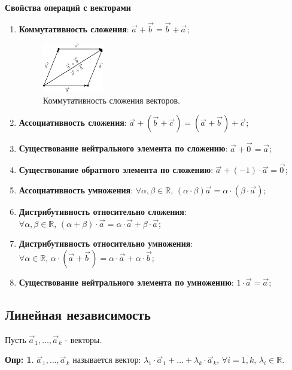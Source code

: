 \documentclass[12pt]{article}
\newcommand{\MR}{\mathbb{R}}
\theoremstyle{definition}
\newtheorem{defn}{Опр:}
\newcommand{\vecm}[1]{\overrightarrow{#1\,}}
\begin{document}
\textbf{Свойства операций с векторами}
\begin{enumerate}[label=\arabic*)]
	\item \textbf{Коммутативность сложения}: $\vecm{a} + \vecm{b} = \vecm{b} + \vecm{a}$;
	\begin{figure}[H]
		\centering
		\includegraphics[width=0.25\textwidth]{ANGL4_5.eps}
		\caption{Коммутативность сложения векторов.}
		\label{4_5}
	\end{figure}
	\item \textbf{Ассоциативность сложения}: $\vecm{a} + \left(\vecm{b} + \vecm{c}\right) = \left(\vecm{a} + \vecm{b}\right) + \vecm{c}$;
	\item \textbf{Существование нейтрального элемента по сложению}: $\vecm{a} + \vecm{0} = \vecm{a}$;
	\item \textbf{Существование обратного элемента по сложению}: $\vecm{a} + (-1){\cdot}\vecm{a} = \vecm{0}$;
	\item \textbf{Ассоциативность умножения}: $\forall \alpha,\beta \in \MR, \, (\alpha{\cdot}\beta)\vecm{a} = \alpha{\cdot}(\beta{\cdot}\vecm{a})$;
	\item \textbf{Дистрибутивность относительно сложения}: $\forall \alpha,\beta \in \MR, \, (\alpha + \beta){\cdot}\vecm{a} = \alpha{\cdot}\vecm{a} + \beta{\cdot}\vecm{a}$;
	\item \textbf{Дистрибутивность относительно умножения}: $\forall \alpha \in \MR, \, \alpha{\cdot}\left(\vecm{a} + \vecm{b}\right) = \alpha{\cdot}\vecm{a} + \alpha{\cdot}\vecm{b}$;
	\item \textbf{Существование нейтрального элемента по умножению}: $1{\cdot}\vecm{a} = \vecm{a}$;
\end{enumerate}

\subsection*{Линейная независимость}
Пусть $\vecm{a}_1, \dotsc, \vecm{a}_k$ - векторы.
\begin{defn}
	 $\vecm{a}_1, \dotsc, \vecm{a}_k$ называется вектор: $\lambda_1{\cdot}\vecm{a}_1 + \dotsc + \lambda_k{\cdot}\vecm{a}_k, \, \forall i = \overline{1,k}, \, \lambda_i \in \MR$.
\end{defn}
\end{document}
